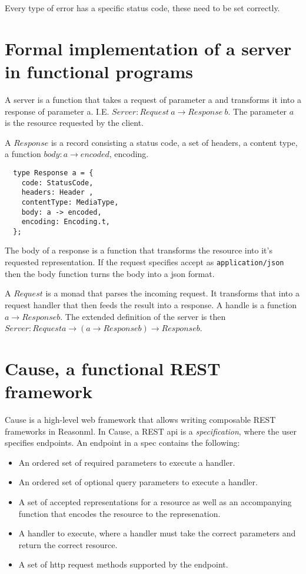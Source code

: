 Every type of error has a specific status code, these need to be set correctly.

\section{Formal implementation of a server in functional programs}

A server is a function that takes a request of parameter a and transforms it
into a response of parameter a. I.E.  $Server : Request\
a\rightarrow Response\
b$. The parameter $a$ is the resource requested by the client.

A $Response$ is a record consisting a status code, a set of headers, a
content type, a function $body: a\rightarrow encoded$, encoding.

\begin{lstlisting}
  type Response a = {
    code: StatusCode,
    headers: Header ,
    contentType: MediaType,
    body: a -> encoded,
    encoding: Encoding.t,
  };
\end{lstlisting}

The body of a response is a function that transforms the resource into it's
requested representation. If the request specifies accept as
\lstinline{application/json} then the body function turns the body into a json
format. 

A $Request$ is a monad that parses the incoming request. It transforms that
into a request handler that then feeds the result into a response. A handle is a
function $a\rightarrow Response b$. The extended definition of the server
is then $Server : Request a \rightarrow (a \rightarrow Response b) \rightarrow
Response b$.

\section{Cause, a functional REST framework}

Cause is a high-level web framework that allows writing composable REST
frameworks in Reasonml. In Cause, a REST api is a \textit{specification}, where
the user specifies endpoints. An endpoint in a spec contains the following:

\begin{itemize}
\item An ordered set of required parameters to execute a handler.
\item An ordered set of optional query parameters to execute a handler.
\item A set of accepted representations for a resource as well as an
accompanying function that encodes the resource to the represenation.
\item A handler to execute, where a handler must take the correct parameters and
return the correct resource.
\item A set of http request methods supported by the endpoint.
\end{itemize}

